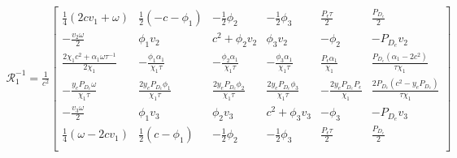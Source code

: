 \begin{align*}
  \mathcal{R}_{1}^{-1} = \frac{1}{c^2}
  \left[
  \begin{array}{cccccc}
   \frac{1}{4} (2 c  v_{1}+\omega ) & \frac{1}{2} (-c- \phi_{1} ) & -\frac{1}{2} \phi_{2}
    & -\frac{1}{2} \phi_{3}  & \frac{P_{\epsilon} \tau }{2} & \frac{P_{D_{e}}}{2}
     \\
   -\frac{v_{2} \omega }{2} & \phi_{1} v_{2}  & c^2+\phi_{2} v_{2}  &
     \phi_{3} v_{2}  & -\phi_{2}  & -P_{D_{e}} v_{2}
     \\
   \frac{2 \chi_{1}  c^2+\alpha_{1}  \omega \tau^{-1} }{2 \chi_{1} } & -\frac{\phi_{1} \alpha_{1}  }{\chi_{1} \tau } &
     -\frac{\phi_{2} \alpha_{1}  }{\chi_{1} \tau } & -\frac{\phi_{3} \alpha_{1} }{\chi_{1} \tau } &
     \frac{P_{\epsilon} \alpha_{1} }{\chi_{1} } & \frac{P_{D_{e}} \left(\alpha_{1} -2 c^2\right)}{\tau \chi_{1} }
      \\
   -\frac{y_{e} P_{D_{e}} \omega }{\chi_{1} \tau } & \frac{2 y_{e} P_{D_{e}} \phi_{1} }{\chi_{1} \tau } & \frac{2 y_{e} P_{D_{e}}
     \phi_{2} }{\chi_{1} \tau} & \frac{2 y_{e} P_{D_{e}} \phi_{3} }{\chi_{1} \tau} & -\frac{2 y_{e}
     P_{D_{e}} P_{\epsilon} }{\chi_{1} } & \frac{2 P_{D_{e}} \left(c^2-y_{e} P_{D_{e}} \right)}{\tau \chi_{1} }
      \\
   -\frac{v_{3} \omega }{2} & \phi_{1} v_{3}  & \phi_{2} v_{3}   &
     c^2+\phi_{3} v_{3}  & -\phi_{3}  & -P_{D_{e}} v_{3}
      \\
   \frac{1}{4} (\omega -2 c  v_{1}) & \frac{1}{2} (c-\phi_{1} ) & -\frac{1}{2} \phi_{2}
       & -\frac{1}{2} \phi_{3}  & \frac{P_{\epsilon} \tau }{2} & \frac{P_{D_{e}}}{2}
     \\
  \end{array}
  \right]
\end{align*}

